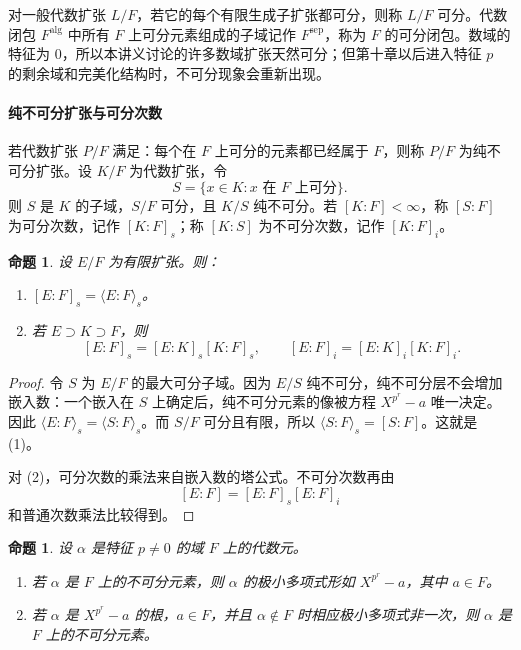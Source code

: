 \documentclass[11pt,a4paper,openany]{ctexbook}
\numberwithin{equation}{chapter}
\theoremstyle{plain}
\newtheorem{proposition}[theorem]{命题}
\theoremstyle{definition}
\theoremstyle{remark}
\begin{document}
对一般代数扩张 $L/F$，若它的每个有限生成子扩张都可分，则称 $L/F$ 可分。代数闭包 $F^{\mathrm{alg}}$ 中所有 $F$ 上可分元素组成的子域记作 $F^{\mathrm{sep}}$，称为 $F$ 的可分闭包。数域的特征为 $0$，所以本讲义讨论的许多数域扩张天然可分；但第十章以后进入特征 $p$ 的剩余域和完美化结构时，不可分现象会重新出现。

\paragraph{纯不可分扩张与可分次数}
若代数扩张 $P/F$ 满足：每个在 $F$ 上可分的元素都已经属于 $F$，则称 $P/F$ 为纯不可分扩张。设 $K/F$ 为代数扩张，令
\[
S=\{x\in K:x\text{ 在 }F\text{ 上可分}\}.
\]
则 $S$ 是 $K$ 的子域，$S/F$ 可分，且 $K/S$ 纯不可分。若 $[K:F]<\infty$，称 $[S:F]$ 为可分次数，记作 $[K:F]_s$；称 $[K:S]$ 为不可分次数，记作 $[K:F]_i$。

\begin{proposition}
设 $E/F$ 为有限扩张。则：
\begin{enumerate}[label=(\arabic*)]
\item $[E:F]_s=\langle E:F\rangle_s$。
\item 若 $E\supset K\supset F$，则
\[
[E:F]_s=[E:K]_s[K:F]_s,\qquad
[E:F]_i=[E:K]_i[K:F]_i.
\]
\end{enumerate}
\end{proposition}

\begin{proof}
令 $S$ 为 $E/F$ 的最大可分子域。因为 $E/S$ 纯不可分，纯不可分层不会增加嵌入数：一个嵌入在 $S$ 上确定后，纯不可分元素的像被方程 $X^{p^r}-a$ 唯一决定。因此 $\langle E:F\rangle_s=\langle S:F\rangle_s$。而 $S/F$ 可分且有限，所以 $\langle S:F\rangle_s=[S:F]$。这就是 (1)。

对 (2)，可分次数的乘法来自嵌入数的塔公式。不可分次数再由
\[
[E:F]=[E:F]_s[E:F]_i
\]
和普通次数乘法比较得到。
\end{proof}

\begin{proposition}
设 $\alpha$ 是特征 $p\ne0$ 的域 $F$ 上的代数元。
\begin{enumerate}[label=(\arabic*)]
\item 若 $\alpha$ 是 $F$ 上的不可分元素，则 $\alpha$ 的极小多项式形如 $X^{p^r}-a$，其中 $a\in F$。
\item 若 $\alpha$ 是 $X^{p^r}-a$ 的根，$a\in F$，并且 $\alpha\notin F$ 时相应极小多项式非一次，则 $\alpha$ 是 $F$ 上的不可分元素。
\end{enumerate}
\end{proposition}
\end{document}

